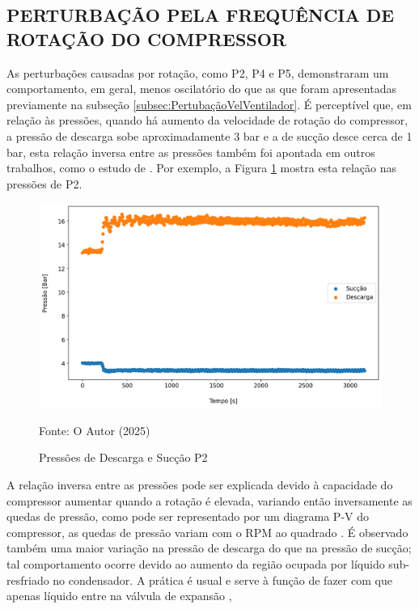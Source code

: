 \subsection{\MakeUppercase{Perturbação pela Frequência de Rotação do Compressor}}\label{subsec:PertubaçãoRotacaoCompressor}


As perturbações causadas por rotação, como P2, P4 e P5, demonstraram um comportamento, em geral, menos oscilatório do que as que foram apresentadas previamente na subseção \ref{subsec:PertubaçãoVelVentilador}. É perceptível que, em relação às pressões, quando há aumento da velocidade de rotação do compressor, a pressão de descarga sobe aproximadamente 3 bar e a de sucção desce cerca de 1 bar, esta relação inversa entre as pressões também foi apontada em outros trabalhos, como o estudo de \textcite{EffectsOFRefrigeranteCompressorAirFlow}. Por exemplo, a Figura \ref{fig:Pressão de Descarga e Sucção P2} mostra esta relação nas pressões de P2. 
\newpage
\begin{figure}
    \centering
    \includegraphics[width=1\linewidth]{FigurasdoTexto/Pressão de Descarga e Sucção P2.png}
    \caption{Pressões de Descarga e Sucção P2}
    \label{fig:Pressão de Descarga e Sucção P2}
    {\footnotesize Fonte: O Autor (2025)}
\end{figure}

A relação inversa entre as pressões pode ser explicada devido à capacidade do compressor aumentar quando a rotação é elevada, variando então inversamente as quedas de pressão, como pode ser representado por um diagrama P-V do compressor, as quedas de pressão variam com o RPM ao quadrado \cite{phillippi2008basic}.
É observado também uma maior variação na pressão de descarga do que na pressão de sucção; tal comportamento ocorre devido ao aumento da região ocupada por líquido sub-resfriado no condensador. A prática é usual e serve à função de fazer com que apenas líquido entre na válvula de expansão \cite{StoekerRefrigeration},


